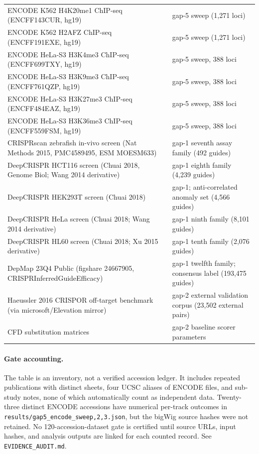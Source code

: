 \begin{longtable}{@{}p{}p{}@{}}
ENCODE K562 H4K20me1 ChIP-seq (ENCFF143CUR, hg19) & gap-5 sweep (1,271 loci) \\
ENCODE K562 H2AFZ ChIP-seq (ENCFF191EXE, hg19) & gap-5 sweep (1,271 loci) \\
ENCODE HeLa-S3 H3K4me3 ChIP-seq (ENCFF699TXY, hg19) & gap-5 sweep, 388 loci \\
ENCODE HeLa-S3 H3K9me3 ChIP-seq (ENCFF761QZP, hg19) & gap-5 sweep, 388 loci \\
ENCODE HeLa-S3 H3K27me3 ChIP-seq (ENCFF484EAZ, hg19) & gap-5 sweep, 388 loci \\
ENCODE HeLa-S3 H3K36me3 ChIP-seq (ENCFF559FSM, hg19) & gap-5 sweep, 388 loci \\
CRISPRscan zebrafish in-vivo screen (Nat Methods 2015, PMC4589495, ESM MOESM633) & gap-1 seventh assay family (492 guides) \\
DeepCRISPR HCT116 screen (Chuai 2018, Genome Biol; Wang 2014 derivative) & gap-1 eighth family (4,239 guides) \\
DeepCRISPR HEK293T screen (Chuai 2018) & gap-1; anti-correlated anomaly set (4,566 guides) \\
DeepCRISPR HeLa screen (Chuai 2018; Wang 2014 derivative) & gap-1 ninth family (8,101 guides) \\
DeepCRISPR HL60 screen (Chuai 2018; Xu 2015 derivative) & gap-1 tenth family (2,076 guides) \\
DepMap 23Q4 Public (figshare 24667905, CRISPRInferredGuideEfficacy) & gap-1 twelfth family; consensus label (193,475 guides) \\
Haeussler 2016 CRISPOR off-target benchmark (via microsoft/Elevation mirror) & gap-2 external validation corpus (23,502 external pairs) \\
CFD substitution matrices & gap-2 baseline scorer parameters \\
\hline
\end{longtable}\endgroup

\paragraph{Gate accounting.}
The table is an inventory, not a verified accession ledger. It includes
repeated publications with distinct sheets, four UCSC aliases of ENCODE files,
and sub-study notes, none of which automatically count as independent data.
Twenty-three distinct ENCODE accessions have numerical per-track outcomes in
\texttt{results/gap5\_encode\_sweep{,2,3}.json}, but the bigWig source hashes
were not retained. No 120-accession-dataset gate is certified until source URLs,
input hashes, and analysis outputs are linked for each counted record.
See \texttt{EVIDENCE\_AUDIT.md}.

